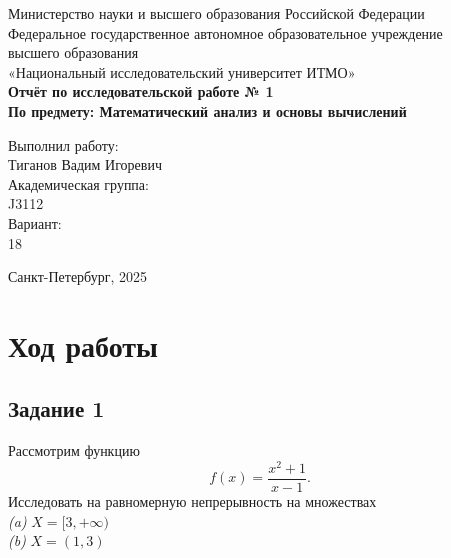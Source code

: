 \documentclass[a4paper,12pt]{article}
\begin{document}
\thispagestyle{empty}
\begin{center}
    \large
    Министерство науки и высшего образования Российской Федерации\\
    Федеральное государственное автономное образовательное учреждение\\
    высшего образования\\
    «Национальный исследовательский университет ИТМО»\\
    \vspace{5cm}
    \textbf{Отчёт по исследовательской работе № 1}\\
    \textbf{По предмету: Математический анализ и основы вычислений}\\
    \vspace{6cm}
    \begin{flushright}
        Выполнил работу:\\ Тиганов Вадим Игоревич\\
        \vspace{1cm}
        Академическая группа: \\ J3112\\
        \vspace{1cm}
        Вариант: \\18
    \end{flushright}
    \vspace{1cm}
    \vspace{3cm}
    \begin{center}
        Санкт-Петербург, 2025\\
    \end{center}
\end{center}

\newpage


\section{Ход работы}

\subsection{Задание 1}

Рассмотрим функцию
\[
f(x) = \frac{x^2 + 1}{x - 1}.
\]
Исследовать на равномерную непрерывность на множествах\\
\emph{(a)} \( X = [3, +\infty) \) \\
\emph{(b)} \( X = (1, 3) \)\\
\end{document}
